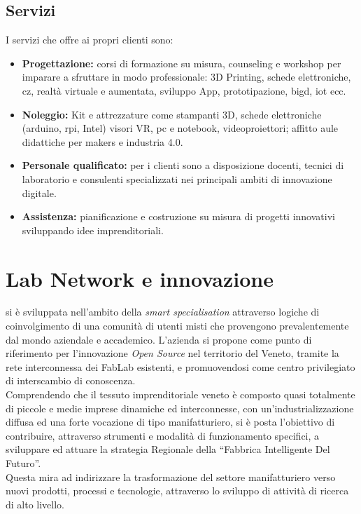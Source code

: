 \subsection{Servizi}
I servizi che \lab{} offre ai propri clienti sono:
\begin{itemize}
\item \textbf{Progettazione:} corsi di formazione su misura, \gls{counseling} e \gls{workshop} per imparare a sfruttare in modo professionale: 3D Printing, schede elettroniche, \gls{cz}, realtà virtuale e aumentata, sviluppo App, prototipazione, \gls{bigd}, \gls{iot} ecc.
\item \textbf{Noleggio:} Kit e attrezzature come stampanti 3D, schede elettroniche (\gls{arduino}, \gls{rpi}, Intel) visori VR, pc e notebook, videoproiettori; affitto aule didattiche per \gls{makers} e industria 4.0.
\item \textbf{Personale qualificato:} per i clienti sono a disposizione docenti, tecnici di laboratorio e consulenti specializzati nei principali ambiti di innovazione digitale.
\item \textbf{Assistenza:} pianificazione e costruzione su misura di progetti innovativi sviluppando idee imprenditoriali.
\end{itemize}

\section{Lab Network e innovazione}
\lab{} si è sviluppata nell’ambito della \textit{smart specialisation} attraverso logiche di coinvolgimento di una comunità di utenti misti che provengono prevalentemente dal mondo aziendale e accademico. 
L'azienda si propone come punto di riferimento per l’innovazione \textit{Open Source} nel territorio del Veneto, tramite la rete interconnessa dei \gls{FabLab} esistenti, e promuovendosi come centro privilegiato di interscambio di conoscenza.\\
Comprendendo che il tessuto imprenditoriale veneto è composto quasi totalmente di piccole e medie imprese dinamiche ed interconnesse, con un’industrializzazione diffusa ed una forte vocazione di tipo manifatturiero, \lab{} si è posta l’obiettivo di contribuire, attraverso strumenti e modalità di funzionamento specifici, a sviluppare ed attuare la strategia Regionale della ``Fabbrica Intelligente Del Futuro''.\\
Questa mira ad indirizzare la trasformazione del settore manifatturiero verso nuovi prodotti, processi e tecnologie, attraverso lo sviluppo di attività di ricerca di alto livello.

